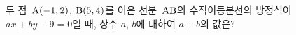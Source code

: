 두 점~$\mathrm{A}(-1{,}\mkern3mu\mathopen{}2)$, $\mathrm{B}(5{,}\mkern3mu\mathopen{}4)$를 이은 선분~$\mathrm{AB}$의 수직이등분선의 방정식이 $ax+by-9=0$일 때, 상수 $a$, $b$에 대하여 $a+b$의 값은?
